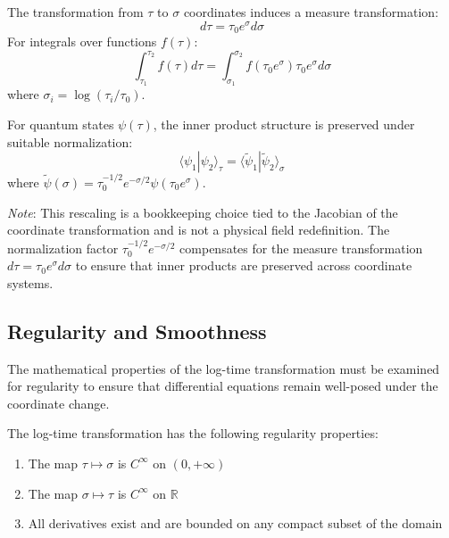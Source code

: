 \begin{theorem}
\label{thm:measure_transformation}
The transformation from $\tau$ to $\sigma$ coordinates induces a measure transformation:
\begin{equation}
d\tau = \tau_0 e^\sigma d\sigma
\end{equation}
For integrals over functions $f(\tau)$:
\begin{equation}
\int_{\tau_1}^{\tau_2} f(\tau) d\tau = \int_{\sigma_1}^{\sigma_2} f(\tau_0 e^\sigma) \tau_0 e^\sigma d\sigma
\end{equation}
where $\sigma_i = \log(\tau_i/\tau_0)$.
\end{theorem}

\begin{corollary}
For quantum states $\psi(\tau)$, the inner product structure is preserved under suitable normalization:
\begin{equation}
\langle \psi_1 | \psi_2 \rangle_\tau = \langle \tilde{\psi}_1 | \tilde{\psi}_2 \rangle_\sigma
\end{equation}
where $\tilde{\psi}(\sigma) = \tau_0^{-1/2} e^{-\sigma/2} \psi(\tau_0 e^\sigma)$.

\emph{Note}: This rescaling is a bookkeeping choice tied to the Jacobian of the coordinate transformation and is not a physical field redefinition. The normalization factor $\tau_0^{-1/2} e^{-\sigma/2}$ compensates for the measure transformation $d\tau = \tau_0 e^\sigma d\sigma$ to ensure that inner products are preserved across coordinate systems.
\end{corollary}

\subsection{Regularity and Smoothness}
\label{subsec:regularity}

The mathematical properties of the log-time transformation must be examined for regularity to ensure that differential equations remain well-posed under the coordinate change.

\begin{theorem}
\label{thm:smoothness}
The log-time transformation has the following regularity properties:
\begin{enumerate}
\item The map $\tau \mapsto \sigma$ is $C^\infty$ on $(0,+\infty)$
\item The map $\sigma \mapsto \tau$ is $C^\infty$ on $\mathbb{R}$
\item All derivatives exist and are bounded on any compact subset of the domain
\end{enumerate}
\end{theorem}


